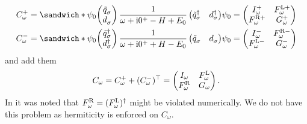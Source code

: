 \begin{subequations}
    \begin{align}
        C^+_\omega
         & =
        \sandwich*
        {\psi_0}
        {
            \begin{pmatrix}
                \tilde q^{\pdag}_\sigma \\
                d^{\pdag}_\sigma
            \end{pmatrix}
            \frac{1}{\omega + \mi0^+ - H + E_0}
            \begin{pmatrix}
                \tilde q^\dag_\sigma & d^\dag_\sigma
            \end{pmatrix}
        }
        {\psi_0}
        =
        \begin{pmatrix}
            I^+_\omega      & F^{\mL+}_\omega \\
            F^{\mR+}_\omega & G^+_\omega
        \end{pmatrix} \\
        C^-_\omega
         & =
        \sandwich*
        {\psi_0}
        {
            \begin{pmatrix}
                \tilde q^\dag_\sigma \\
                d^\dag_\sigma
            \end{pmatrix}
            \frac{1}{\omega + \mi0^+ + H - E_0}
            \begin{pmatrix}
                \tilde q^{\pdag}_\sigma & d^{\pdag}_\sigma
            \end{pmatrix}
        }
        {\psi_0}
        =
        \begin{pmatrix}
            I^-_\omega      & F^{\mR-}_\omega \\
            F^{\mL-}_\omega & G^-_\omega
        \end{pmatrix}
    \end{align}
\end{subequations}
and add them
\begin{equation}
    C_\omega
    =
    C^+_\omega + (C^-_\omega)^\top
    =
    \begin{pmatrix}
        I_\omega       & F^{\mathrm{L}}_\omega \\
        F^{\mathrm{R}}_\omega & G_\omega
    \end{pmatrix}.
\end{equation}
In \cite{Kugler2022} it was noted that $F^{\mathrm{R}}_\omega = (F^{\mathrm{L}}_\omega)^\dag$
might be violated numerically.
We do not have this problem as hermiticity is enforced on $C_\omega$.

